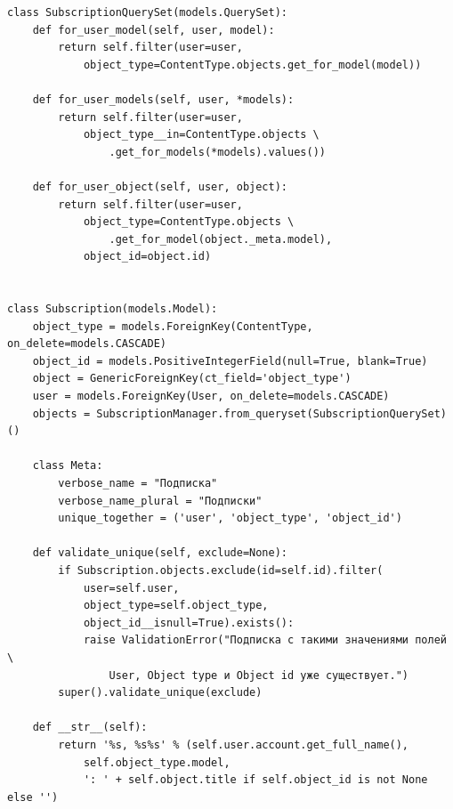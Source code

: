 \documentclass[12pt, a4paper, oneside]{article}
\begin{document}
\begin{verbatim}
class SubscriptionQuerySet(models.QuerySet):
    def for_user_model(self, user, model):
        return self.filter(user=user, 
            object_type=ContentType.objects.get_for_model(model))

    def for_user_models(self, user, *models):
        return self.filter(user=user, 
            object_type__in=ContentType.objects \
                .get_for_models(*models).values())
    
    def for_user_object(self, user, object):
        return self.filter(user=user, 
            object_type=ContentType.objects \
                .get_for_model(object._meta.model),
            object_id=object.id)


class Subscription(models.Model):
    object_type = models.ForeignKey(ContentType, on_delete=models.CASCADE)
    object_id = models.PositiveIntegerField(null=True, blank=True)
    object = GenericForeignKey(ct_field='object_type')
    user = models.ForeignKey(User, on_delete=models.CASCADE)
    objects = SubscriptionManager.from_queryset(SubscriptionQuerySet)()

    class Meta:
        verbose_name = "Подписка"
        verbose_name_plural = "Подписки"
        unique_together = ('user', 'object_type', 'object_id')

    def validate_unique(self, exclude=None):
        if Subscription.objects.exclude(id=self.id).filter(
            user=self.user, 
            object_type=self.object_type, 
            object_id__isnull=True).exists():
            raise ValidationError("Подписка с такими значениями полей \
                User, Object type и Object id уже существует.")
        super().validate_unique(exclude)

    def __str__(self):
        return '%s, %s%s' % (self.user.account.get_full_name(), 
            self.object_type.model,
            ': ' + self.object.title if self.object_id is not None else '')
\end{verbatim}
\end{document}
